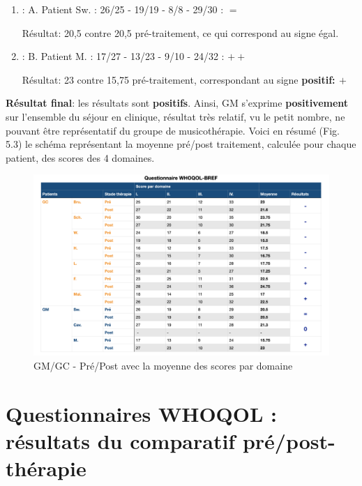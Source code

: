  \begin{enumerate}
 	\item : A. Patient Sw. : 26/25 - 19/19 - 8/8 - 29/30 :   $=$
 	
 	
 	
 	Résultat: 20,5 contre 20,5 pré-traitement, ce qui
 	correspond au signe égal.
 	
 	
 	
 	\item : B. Patient M. : 17/27 - 13/23 -  9/10 - 24/32 :  $++$
 	
 	Résultat: 23 contre 15,75 pré-traitement, correspondant
 	au signe \textbf{positif: $+$}
 \end{enumerate}
 \textbf{ Résultat final}: les résultats sont \textbf{positifs}.
 Ainsi,  GM s'exprime
 \textbf{positivement}
 sur l'ensemble du séjour en clinique, résultat très relatif, vu le petit nombre, ne pouvant être  
 représentatif du 
 groupe de 
 musicothérapie.
 Voici en résumé (Fig. 5.3) le schéma représentant la moyenne pré/post traitement, calculée pour chaque 
 patient, des scores des 4 domaines.
 
 
 \begin{figure}
 	\centering
 	\includegraphics[width=\linewidth]{images/graphiques/questionnaire_wq.png}
 	\caption[Questionnaire WHOQOL-BREF]{GM/GC - Pré/Post avec la moyenne des scores par 
 		domaine}
 	
 \end{figure}
 
 
 
 
 
 \section*{Questionnaires WHOQOL : résultats du comparatif pré/post-thérapie}
 
